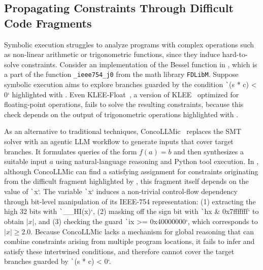 \documentclass[acmsmall,screen,nonacm]{acmart}
\theoremstyle{definition}
\begin{document}
\subsection{Propagating Constraints Through Difficult Code Fragments}

Symbolic execution struggles to analyze programs with complex operations such as non-linear arithmetic or trigonometric functions, since they induce hard-to-solve constraints. Consider an implementation of the Bessel function in , which is a part of the function \texttt{\_ieee754\_j0} from the math library \texttt{FDLibM}. Suppose symbolic execution aims to explore branches guarded by the condition \texttt`(s * c) < 0` highlighted with \hlg{\phantom{X}}. Even KLEE-Float~\cite{kleeFloat}, a version of KLEE~\cite{klee} optimized for floating-point operations, fails to solve the resulting constraints, because this check depends on the output of trigonometric operations highlighted with \hly{\phantom{X}}.

As an alternative to traditional techniques, ConcoLLMic~\cite{concollmic} replaces the SMT solver with an agentic LLM workflow to generate inputs that cover target branches. It formulates queries of the form $f(a) = b$ and then  synthesizes a suitable input $a$ using natural-language reasoning and Python tool execution. In , although ConcoLLMic can find a satisfying assignment for constraints originating from the difficult fragment highlighted by \hly{\phantom{X}}, this fragment itself depends on the value of \texttt`x`. The variable \texttt`x` induces a non-trivial control-flow dependency through bit-level manipulation of its IEEE-754 representation: (1) extracting the high 32 bits with \texttt`__HI(x)`, (2) masking off the sign bit with \texttt`hx & 0x7fffffff` to obtain $|x|$, and (3) checking the guard \texttt`ix >= 0x40000000`, which corresponds to $|x| \ge 2.0$. Because ConcoLLMic lacks a mechanism for global reasoning that can combine constraints arising from multiple program locations, it fails to infer and satisfy these intertwined conditions, and therefore cannot cover the target branches guarded by \texttt`(s * c) < 0`.
\end{document}
